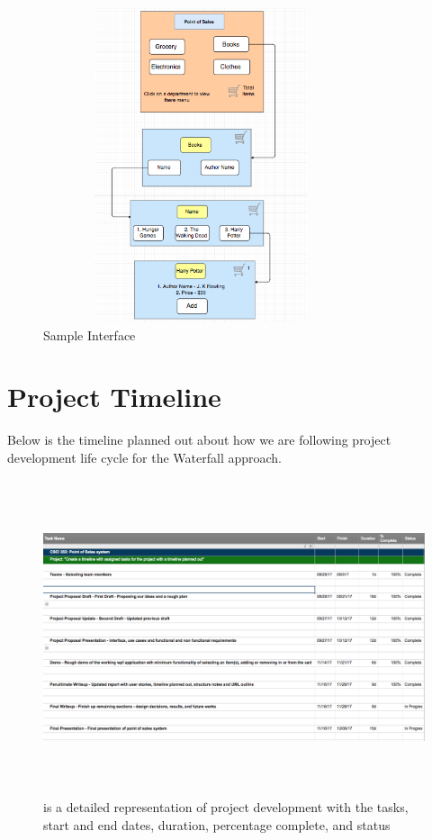 \documentclass[10pt,conference,onecolumn,compsoc]{IEEEtran}
\begin{document}

\begin{figure}[H]
\includegraphics[height=350px, width=350px]{interface1}
\caption{Sample Interface}
\label{cat1}
\end{figure}

\section{Project Timeline}
 Below is the timeline planned out about how we are following project development life cycle for the Waterfall approach. 
 
\begin{figure}[H]
\includegraphics[height=350px, width=450px]{PT(detail)}
\caption{is a detailed representation of project development with the tasks, start and end dates, duration, percentage complete, and status}
\label{PT}
\end{figure}
\end{document}
